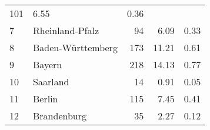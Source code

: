 \begin{longtable}{lXrrr}
       \num{101} &
       \num[round-mode=places,round-precision=2]{6.55} &
         \num[round-mode=places,round-precision=2]{0.36} \\

     7 &
     \multicolumn{1}{X}{ Rheinland-Pfalz   } &


       \num{94} &
       \num[round-mode=places,round-precision=2]{6.09} &
         \num[round-mode=places,round-precision=2]{0.33} \\

     8 &
     \multicolumn{1}{X}{ Baden-Württemberg   } &


       \num{173} &
       \num[round-mode=places,round-precision=2]{11.21} &
         \num[round-mode=places,round-precision=2]{0.61} \\

     9 &
     \multicolumn{1}{X}{ Bayern   } &


       \num{218} &
       \num[round-mode=places,round-precision=2]{14.13} &
         \num[round-mode=places,round-precision=2]{0.77} \\

     10 &
     \multicolumn{1}{X}{ Saarland   } &


       \num{14} &
       \num[round-mode=places,round-precision=2]{0.91} &
         \num[round-mode=places,round-precision=2]{0.05} \\

     11 &
     \multicolumn{1}{X}{ Berlin   } &


       \num{115} &
       \num[round-mode=places,round-precision=2]{7.45} &
         \num[round-mode=places,round-precision=2]{0.41} \\

     12 &
     \multicolumn{1}{X}{ Brandenburg   } &


       \num{35} &
       \num[round-mode=places,round-precision=2]{2.27} &
         \num[round-mode=places,round-precision=2]{0.12} \\


\end{longtable}
